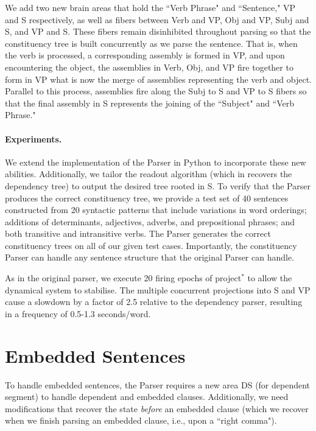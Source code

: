 \documentclass[11pt]{article}
\begin{document}
We add two new brain areas that hold the ``Verb Phrase" and ``Sentence," {\sc VP} and {\sc S} respectively, as well as fibers between {\sc Verb} and {\sc VP}, {\sc Obj} and {\sc VP}, {\sc Subj} and {\sc S}, and {\sc VP} and {\sc S}. These fibers remain disinhibited throughout parsing so that the constituency tree is built concurrently as we parse the sentence. That is, when the verb is processed, a corresponding assembly is formed in {\sc VP}, and upon encountering the object, the assemblies in {\sc Verb}, {\sc Obj}, and {\sc VP} fire together to form in {\sc VP} what is now the merge of assemblies representing the verb and object. Parallel to this process, assemblies fire along the {\sc Subj} to {\sc S} and {\sc VP} to {\sc S} fibers so that the final assembly in S represents the joining of the ``Subject" and ``Verb Phrase." 

\paragraph{Experiments.}
We extend the implementation of the Parser in Python to incorporate these new abilities. Additionally, we tailor the readout algorithm (which in \citet{Parser} recovers the dependency tree) to output the desired tree rooted in {\sc S}. To verify that the Parser produces the correct constituency tree, we provide a test set of 40 sentences constructed from 20 syntactic patterns that include variations in word orderings; additions of determinants, adjectives, adverbs, and prepositional phrases; and both transitive and intransitive verbs. The Parser generates the correct constituency trees on all of our given test cases. Importantly, the constituency Parser can handle any sentence structure that the original Parser can handle. 

As in the original parser, we execute 20 firing epochs of project$^*$ to allow the dynamical system to stabilise. The multiple concurrent projections into S and VP cause a slowdown by a factor of 2.5 relative to the dependency parser, resulting in a frequency of 0.5-1.3 seconds/word. 

\section{Embedded Sentences}
To handle embedded sentences, the Parser requires a new area {\sc DS} (for dependent segment) to handle dependent and embedded clauses.  Additionally, we need modifications that recover the state {\em before} an embedded clause (which we recover when we finish parsing an embedded clause, i.e., upon a ``right comma").
\end{document}
